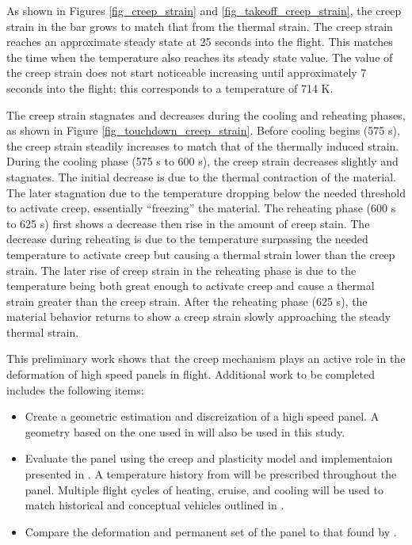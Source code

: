 \documentclass[conf]{new-aiaa}
\begin{document}
As shown in Figures \ref{fig_creep_strain}
and \ref{fig_takeoff_creep_strain}, the creep strain in the bar 
grows to match that from the thermal strain. 
The creep strain reaches an approximate steady state 
at 25 seconds into the flight. 
This matches the time when the temperature also reaches
its steady state value.
The value of the creep strain does not start noticeable increasing
until approximately 7 seconds into the flight;
this corresponds to a temperature of 714 K.

The creep strain stagnates and decreases during the cooling 
and reheating phases, as shown in Figure \ref{fig_touchdown_creep_strain}.
Before cooling begins (575 s), the creep strain steadily increases to 
match that of the thermally induced strain.
During the cooling phase (575 s to 600 s), the creep strain
decreases slightly and stagnates. 
The initial decrease is due to the thermal contraction of the material.
The later stagnation due to the temperature dropping below the needed 
threshold to activate creep, essentially ``freezing'' the material.
The reheating phase (600 s to 625 s) first shows a decrease then rise in 
the amount of creep stain.
The decrease during reheating is due to the temperature surpassing the
needed temperature to activate creep but causing a thermal strain
lower than the creep strain.
The later rise of creep strain in the reheating phase is due
to the temperature being both great enough to activate creep
and cause a thermal strain greater than the creep strain.
After the reheating phase (625 s), the material behavior
returns to show a creep strain slowly approaching the steady 
thermal strain.

This preliminary work shows that the creep mechanism plays an active role in the deformation 
of high speed panels in flight.
Additional work to be completed includes the following items:

\begin{itemize}
  \item Create a geometric estimation and discreization of a high speed panel.
        A geometry based on the one used in 
        \cite{ culler_impact_of_FTS_coupling_on_response_prediction_hypersonic_skin_panels}
        will also be used in this study.
  \item Evaluate the panel using the creep and plasticity model and implementaion presented in
        \cite{ li_simulation_of_finite_strain_inelastic_phenomena_governed_by_creep_and_plasticity}.
        A temperature history from 
        \cite{ culler_impact_of_FTS_coupling_on_response_prediction_hypersonic_skin_panels}
        will be prescribed throughout the panel. 
        Multiple flight cycles of heating, cruise, and cooling will be used
        to match historical and conceptual vehicles outlined in
        \cite{ kordes_structureal_heating_experiencs_on_the_x15_airplane,
               zuchowski_AVIATR_Predictive_capability_for_hypersonic_structural_response_and_life_prediction_phase_II}.
  \item Compare the deformation and permanent set of the panel to that 
        found by \cite{ culler_impact_of_FTS_coupling_on_response_prediction_hypersonic_skin_panels}.
\end{itemize}
\end{document}

